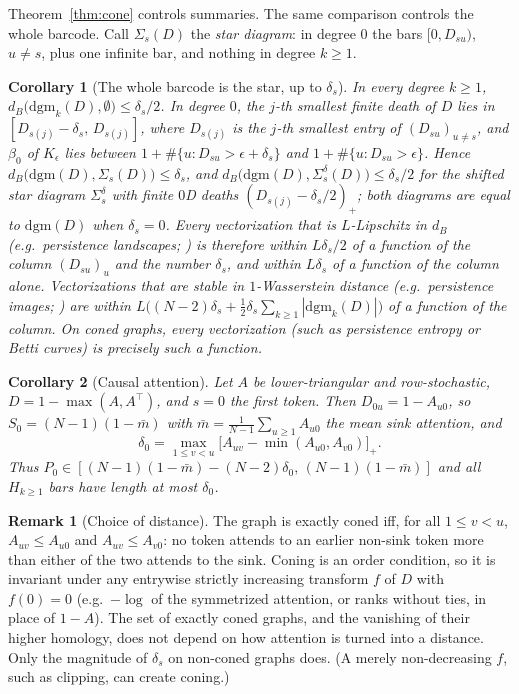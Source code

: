 \documentclass{article}
\newtheorem{corollary}{Corollary}
\theoremstyle{definition}
\newtheorem{remark}{Remark}
\newcommand{\dgm}{\mathrm{dgm}}
\newcommand{\defect}{\delta}
\newcommand{\stw}{S}
\begin{document}
Theorem~\ref{thm:cone} controls summaries. The same comparison controls the whole barcode. Call $\Sigma_s(D)$ the \emph{star diagram}: in degree $0$ the bars $[0,D_{su})$, $u\ne s$, plus one infinite bar, and nothing in degree $k\ge1$.

\begin{corollary}[The whole barcode is the star, up to $\defect_s$]
\label{cor:diagram}
In every degree $k\ge1$, $d_B\big(\dgm_k(D),\emptyset\big)\le\defect_s/2$. In degree $0$, the $j$-th smallest finite death of $D$ lies in $[D_{s(j)}-\defect_s,\,D_{s(j)}]$, where $D_{s(j)}$ is the $j$-th smallest entry of $(D_{su})_{u\ne s}$, and $\beta_0$ of $K_\epsilon$ lies between $1+\#\{u:D_{su}>\epsilon+\defect_s\}$ and $1+\#\{u:D_{su}>\epsilon\}$. Hence $d_B\big(\dgm(D),\Sigma_s(D)\big)\le\defect_s$, and $d_B\big(\dgm(D),\Sigma_s^{\defect}(D)\big)\le\defect_s/2$ for the shifted star diagram $\Sigma_s^{\defect}$ with finite $0$D deaths $(D_{s(j)}-\defect_s/2)_+$; both diagrams are equal to $\dgm(D)$ when $\defect_s=0$. Every vectorization that is $L$-Lipschitz in $d_B$ (e.g.\ persistence landscapes; \citealp{bubenik2015landscapes}) is therefore within $L\defect_s/2$ of a function of the column $(D_{su})_u$ and the number $\defect_s$, and within $L\defect_s$ of a function of the column alone. Vectorizations that are stable in $1$-Wasserstein distance (e.g.\ persistence images; \citealp{adams2017persistence}) are within $L\big((N{-}2)\defect_s+\tfrac12\defect_s\sum_{k\ge1}|\dgm_k(D)|\big)$ of a function of the column. On coned graphs, every vectorization (such as persistence entropy or Betti curves) is precisely such a function.
\end{corollary}

\begin{corollary}[Causal attention]
\label{cor:causal}
Let $A$ be lower-triangular and row-stochastic, $D=1-\max(A,A^\top)$, and $s=0$ the first token. Then $D_{0u}=1-A_{u0}$, so $\stw_0=(N-1)(1-\bar m)$ with $\bar m=\frac{1}{N-1}\sum_{u\ge1}A_{u0}$ the mean sink attention, and
\[
\defect_0=\max_{1\le v<u}\big[A_{uv}-\min(A_{u0},A_{v0})\big]_+ .
\]
Thus $P_0\in[(N-1)(1-\bar m)-(N-2)\defect_0,\,(N-1)(1-\bar m)]$ and all $H_{k\ge1}$ bars have length at most $\defect_0$.
\end{corollary}

\begin{remark}[Choice of distance]
The graph is exactly coned iff, for all $1\le v<u$, $A_{uv}\le A_{u0}$ and $A_{uv}\le A_{v0}$: no token attends to an earlier non-sink token more than either of the two attends to the sink.
Coning is an order condition, so it is invariant under any entrywise strictly increasing transform $f$ of $D$ with $f(0)=0$ (e.g.\ $-\log$ of the symmetrized attention, or ranks without ties, in place of $1-A$). The set of exactly coned graphs, and the vanishing of their higher homology, does not depend on how attention is turned into a distance. Only the magnitude of $\defect_s$ on non-coned graphs does. (A merely non-decreasing $f$, such as clipping, can create coning.)
\end{remark}
\end{document}
